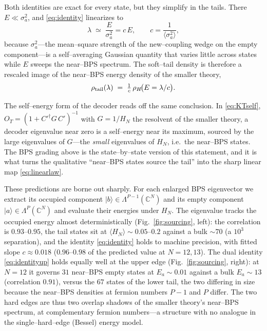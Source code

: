 \documentclass[11pt]{article}
\newcommand{\ket}[1]{\lvert #1\rangle}
\newcommand{\OT}{O_T}
\newcommand{\dg}{^{\dagger}}
\begin{document}
Both identities are exact for every state, but they simplify in the tails. There $E\ll\sigma_a^2$, and
\eqref{eq:identity} linearizes to
\begin{equation}
  \lambda\;\simeq\; \frac{E}{\sigma_a^2}=c\,E,\qquad c=\frac{1}{\langle\sigma_a^2\rangle},
  \label{eq:linearlaw}
\end{equation}
because $\sigma_a^2$---the mean--square strength of the new--coupling wedge on the empty component---is
a self--averaging Gaussian quantity that varies little across states while $E$ sweeps the near--BPS
spectrum. The soft--tail density is therefore a rescaled image of the near--BPS energy density of the
smaller theory,
\begin{equation}
  \rho_{\rm tail}(\lambda)\;=\;\tfrac1c\,\rho_H\!\big(E=\lambda/c\big).
  \label{eq:tailimage}
\end{equation}

The self--energy form of the decoder reads off the same conclusion. In \eqref{eq:KTself},
$\OT=(1+{C'}\dg G\,C')^{-1}$ with $G=1/H_N$ the resolvent of the smaller theory, a decoder eigenvalue near zero
is a self--energy near its maximum, sourced by the large eigenvalues of $G$---the \emph{small}
eigenvalues of $H_N$, i.e.\ the near--BPS states. The BPS grading above is the state--by--state version
of this statement, and it is what turns the qualitative ``near--BPS states source the tail'' into the
sharp linear map \eqref{eq:linearlaw}.

These predictions are borne out sharply. For each enlarged BPS eigenvector we extract its occupied
component $\ket b\in\Lambda^{P-1}(\mathbb C^N)$ and its empty component $\ket a\in\Lambda^P(\mathbb C^N)$
and evaluate their energies under $H_N$. The eigenvalue tracks the occupied energy almost
deterministically (Fig.~\ref{fig:sourcing}, left): the correlation is $0.93$--$0.95$, the tail states
sit at $\langle H_N\rangle\sim0.05$--$0.2$ against a bulk $\sim70$ (a $10^3$ separation), and the
identity \eqref{eq:identity} holds to machine precision, with fitted slope $c\approx0.018$
($0.96$--$0.98$ of the predicted value at $N=12,13$). The dual identity \eqref{eq:identityup} holds
equally well at the upper edge (Fig.~\ref{fig:sourcing}, right): at $N=12$ it governs $31$ near--BPS
empty states at $E_a\sim0.01$ against a bulk $E_a\sim13$ (correlation $0.91$), versus the $67$ states
of the lower tail, the two differing in size because the near--BPS densities at fermion numbers $P-1$
and $P$ differ. The two hard edges are thus two overlap shadows of the smaller theory's near--BPS
spectrum, at complementary fermion numbers---a structure with no analogue in the single--hard--edge
(Bessel) energy model.
\end{document}
